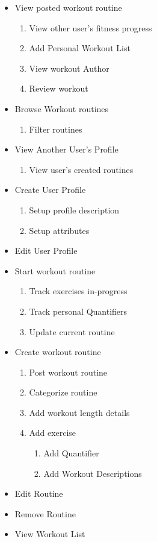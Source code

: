 \documentclass[12pt]{article}
\begin{document}
\begin{itemize}
	\item View posted workout routine 
	\begin{enumerate}
		\item View other user's fitness progress
		\item Add Personal Workout List
		\item View workout Author
		\item Review workout
	\end{enumerate}
	
	\item Browse Workout routines
	\begin{enumerate}
		\item Filter routines
	\end{enumerate}
	
	\item View Another User's Profile
	\begin{enumerate}
		\item View user's created routines
	\end{enumerate}
	
	\item Create User Profile
	\begin{enumerate}
		\item Setup profile description
		\item Setup attributes
	\end{enumerate}
	
	\item Edit User Profile
	
	\item Start workout routine
	\begin{enumerate}
		\item Track exercises in-progress
		\item Track personal Quantifiers
		\item Update current routine
	\end{enumerate}
	
	
	\item Create workout routine
	\begin{enumerate}
		\item Post workout routine
		\item Categorize routine
		\item Add workout length details
		\item Add exercise 
		\begin{enumerate}
			\item Add Quantifier
			\item Add Workout Descriptions
		\end{enumerate}
	\end{enumerate}
	
	\item Edit Routine
	\item Remove Routine
	\item View Workout List
\end{itemize}
\end{document}

